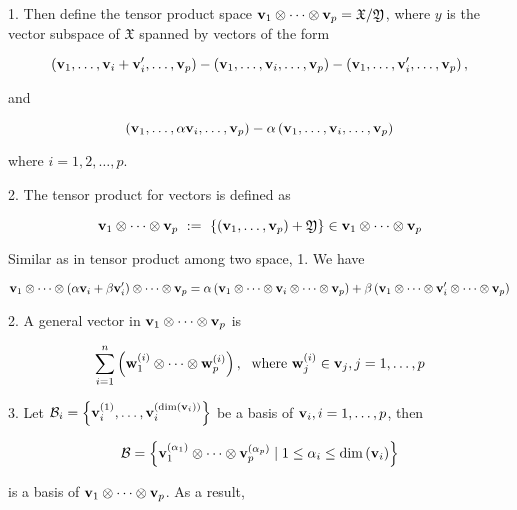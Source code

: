 \documentclass[11pt]{article}
\begin{document}
1. Then define the tensor product space \({\bf v}_1 \otimes  \cdots  \otimes  {\bf v}_{p} = \mathfrak{X}/\mathfrak{Y}\), where \(y\) is the vector subspace of \(\mathfrak{X}\) spanned by vectors of the form

\[
\left( {{\bf v}_1,\ldots ,{\bf v}_{i} + {\bf v}_{i}^{\prime },\ldots ,{\bf v}_{p}}\right)  - \left( {{\bf v}_1,\ldots ,{\bf v}_{i},\ldots ,{\bf v}_{p}}\right)  - \left( {{\bf v}_1,\ldots ,{\bf v}_{i}^{\prime },\ldots ,{\bf v}_{p}}\right) ,
\]

and

\[
\left( {{\bf v}_1,\ldots ,\alpha {\bf v}_{i},\ldots ,{\bf v}_{p}}\right)  - \alpha \left( {{\bf v}_1,\ldots ,{\bf v}_{i},\ldots ,{\bf v}_{p}}\right)
\]

where \(i = 1,2,\ldots ,p\).

2. The tensor product for vectors is defined as

\[
{\bf v}_1 \otimes  \cdots  \otimes  {\bf v}_{p} \mathrel{\text{ := }} \left\{  {\left( {{\bf v}_1,\ldots ,{\bf v}_{p}}\right)  + \mathfrak{Y}}\right\}   \in  {\bf v}_1 \otimes  \cdots  \otimes  {\bf v}_{p}
\]

Similar as in tensor product among two space, 1. We have

\[
{\bf v}_1 \otimes  \cdots  \otimes  \left( {\alpha {\bf v}_{i} + \beta {\bf v}_{i}^{\prime }}\right)  \otimes  \cdots  \otimes  {\bf v}_{p} = \alpha \left( {{\bf v}_1 \otimes  \cdots  \otimes  {\bf v}_{i} \otimes  \cdots  \otimes  {\bf v}_{p}}\right)  + \beta \left( {{\bf v}_1 \otimes  \cdots  \otimes  {\bf v}_{i}^{\prime } \otimes  \cdots  \otimes  {\bf v}_{p}}\right)
\]

2. A general vector in \({\bf v}_1 \otimes  \cdots  \otimes  {\bf v}_{p}\) is

\[
\mathop{\sum }\limits_{{i = 1}}^n\left( {{\bf w}_1^{\left( i\right) } \otimes  \cdots  \otimes  {\bf w}_{p}^{\left( i\right) }}\right) ,\;\text{ where }{\bf w}_{j}^{\left( i\right) } \in  {\bf v}_{j},j = 1,\ldots ,p
\]

3. Let \({\mathcal{B}}_{i} = \left\{  {{\bf v}_{i}^{\left( 1\right) },\ldots ,{\bf v}_{i}^{\left( \dim \left( {\bf v}_{i}\right) \right) }}\right\}\) be a basis of \({\bf v}_{i},i = 1,\ldots ,p\), then

\[
\mathcal{B} = \left\{  {{\bf v}_1^{\left( \alpha_1\right) } \otimes  \cdots  \otimes  {\bf v}_{p}^{\left( \alpha_{p}\right) } \mid  1 \leq  \alpha_{i} \leq  \dim \left( {\bf v}_{i}\right) }\right\}
\]

is a basis of \({\bf v}_1 \otimes  \cdots  \otimes  {\bf v}_{p}\). As a result,
\end{document}
